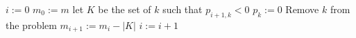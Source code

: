 \begin{algorithmic}
  \STATE $i:=0$
  \STATE $m_0:=m$
    \ENDIF
    \STATE let $K$ be the set of $k$ such that $p_{i+1, k} < 0$
       \STATE $p_k:=0$
       \STATE Remove $k$ from the problem
    \ENDFOR
    \STATE $m_{i+1}:=m_i-|K|$
    \STATE $i:=i+1$
  \ENDWHILE 
\end{algorithmic}

